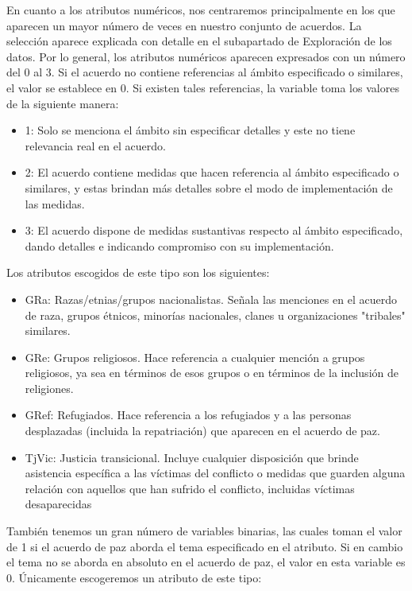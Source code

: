 \documentclass[11pt]{article}
\providecommand{\tightlist}{%
      \setlength{\itemsep}{0pt}\setlength{\parskip}{0pt}}
\begin{document}
En cuanto a los atributos numéricos, nos centraremos principalmente en los
que aparecen un mayor número de veces en nuestro conjunto de acuerdos.
La selección aparece explicada con detalle en el subapartado de Exploración de
los datos. Por lo general, los atributos numéricos aparecen expresados con un
número del 0 al 3. Si el acuerdo no contiene referencias al ámbito
especificado o similares, el valor se establece en 0. Si existen tales
referencias, la variable toma los valores de la siguiente manera:

\begin{itemize}
\tightlist
\item
  1: Solo se menciona el ámbito sin especificar detalles y este no tiene
  relevancia real en el acuerdo.
\item
  2: El acuerdo contiene medidas que hacen referencia al ámbito
  especificado o similares, y estas brindan más detalles sobre el modo
  de implementación de las medidas.
\item
  3: El acuerdo dispone de medidas sustantivas respecto
  al ámbito especificado, dando detalles e indicando compromiso con su
  implementación.
\end{itemize}

Los atributos escogidos de este tipo son los siguientes:

\begin{itemize}
\item
  GRa: Razas/etnias/grupos nacionalistas. Señala las menciones en el
  acuerdo de raza, grupos étnicos, minorías nacionales, clanes u
  organizaciones "tribales" similares.
\item
  GRe: Grupos religiosos. Hace referencia a cualquier mención a grupos
  religiosos, ya sea en términos de esos grupos o en términos de la
  inclusión de religiones. ~
\item
  GRef: Refugiados. Hace referencia a los refugiados y a las personas
  desplazadas (incluida la repatriación) que aparecen en el acuerdo de
  paz.
\item
  TjVic: Justicia transicional. Incluye cualquier disposición que brinde
  asistencia específica a las víctimas del conflicto o medidas que guarden alguna relación con aquellos que han sufrido el conflicto, incluidas víctimas desaparecidas
\end{itemize}

También tenemos un gran número de variables binarias, las cuales toman
el valor de 1 si el acuerdo de paz aborda el tema especificado en el
atributo. Si en cambio el tema no se aborda en absoluto en el acuerdo
de paz, el valor en esta variable es 0. Únicamente escogeremos un atributo de este tipo:
\end{document}

